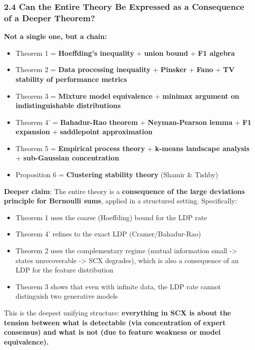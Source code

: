 \documentclass[
  12pt,
]{ctexart}
\providecommand{\tightlist}{%
  \setlength{\itemsep}{0pt}\setlength{\parskip}{0pt}}
\begin{document}
\subsubsection{2.4 Can the Entire Theory Be Expressed as a Consequence
of a Deeper
Theorem?}\label{can-the-entire-theory-be-expressed-as-a-consequence-of-a-deeper-theorem}

\textbf{Not a single one, but a chain:}

\begin{itemize}
\tightlist
\item
  Theorem 1 = \textbf{Hoeffding's inequality} + \textbf{union bound} +
  \textbf{F1 algebra}
\item
  Theorem 2 = \textbf{Data processing inequality} + \textbf{Pinsker} +
  \textbf{Fano} + \textbf{TV stability of performance metrics}
\item
  Theorem 3 = \textbf{Mixture model equivalence} + \textbf{minimax
  argument on indistinguishable distributions}
\item
  Theorem 4' = \textbf{Bahadur-Rao theorem} + \textbf{Neyman-Pearson
  lemma} + \textbf{F1 expansion} + \textbf{saddlepoint approximation}
\item
  Theorem 5 = \textbf{Empirical process theory} + \textbf{k-means
  landscape analysis} + \textbf{sub-Gaussian concentration}
\item
  Proposition 6 = \textbf{Clustering stability theory} (Shamir \&
  Tishby)
\end{itemize}

\textbf{Deeper claim}: The entire theory is a \textbf{consequence of the
large deviations principle for Bernoulli sums}, applied in a structured
setting. Specifically:

\begin{itemize}
\tightlist
\item
  Theorem 1 uses the coarse (Hoeffding) bound for the LDP rate
\item
  Theorem 4' refines to the exact LDP (Cramer/Bahadur-Rao)
\item
  Theorem 2 uses the complementary regime (mutual information small
  -\textgreater{} states unrecoverable -\textgreater{} SCX degrades),
  which is also a consequence of an LDP for the feature distribution
\item
  Theorem 3 shows that even with infinite data, the LDP rate cannot
  distinguish two generative models
\end{itemize}

This is the deepest unifying structure: \textbf{everything in SCX is
about the tension between what is detectable (via concentration of
expert consensus) and what is not (due to feature weakness or model
equivalence).}
\end{document}
